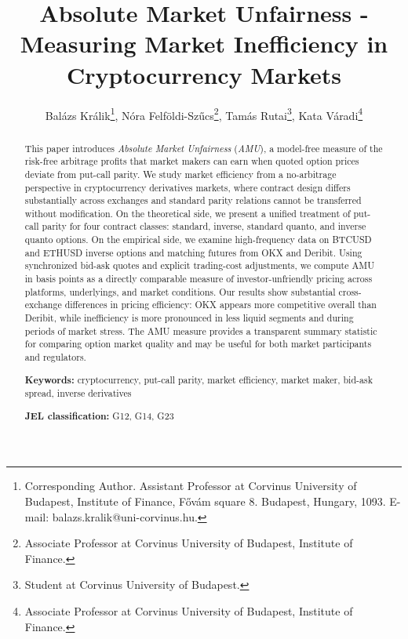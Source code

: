 \documentclass[12pt]{article}
\begin{document}
\title{\textbf{Absolute Market Unfairness - Measuring Market Inefficiency in Cryptocurrency Markets}}

\author{Balázs Králik\thanks{Corresponding Author. Assistant Professor at Corvinus University of Budapest, Institute of Finance, Fővám square 8. Budapest, Hungary, 1093. E-mail: balazs.kralik@uni-corvinus.hu.}, Nóra Felföldi-Szűcs\thanks{Associate Professor at Corvinus University of Budapest, Institute of Finance.}, Tamás Rutai\thanks{Student at Corvinus University of Budapest.}, Kata Váradi\thanks{Associate Professor at Corvinus University of Budapest, Institute of Finance.}}
\date{}

\maketitle

\begin{abstract}

This paper introduces \textit{Absolute Market Unfairness} (\textit{AMU}), a model-free measure of the risk-free arbitrage profits that market makers can earn when quoted option prices deviate from put-call parity. We study market efficiency from a no-arbitrage perspective in cryptocurrency derivatives markets, where contract design differs substantially across exchanges and standard parity relations cannot be transferred without modification. On the theoretical side, we present a unified treatment of put-call parity for four contract classes: standard, inverse, standard quanto, and inverse quanto options. On the empirical side, we examine high-frequency data on BTCUSD and ETHUSD inverse options and matching futures from OKX and Deribit. Using synchronized bid-ask quotes and explicit trading-cost adjustments, we compute AMU in basis points as a directly comparable measure of investor-unfriendly pricing across platforms, underlyings, and market conditions. Our results show substantial cross-exchange differences in pricing efficiency: OKX appears more competitive overall than Deribit, while inefficiency is more pronounced in less liquid segments and during periods of market stress. The AMU measure provides a transparent summary statistic for comparing option market quality and may be useful for both market participants and regulators.


\medskip

\textbf{Keywords:} cryptocurrency, put-call parity, market efficiency, market maker, bid-ask spread, inverse derivatives

\medskip

\textbf{JEL classification:} G12, G14, G23

\end{abstract}
\end{document}
